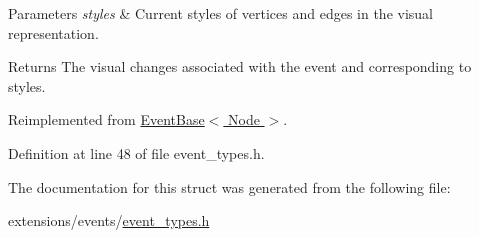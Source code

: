 \begin{DoxyParams}{Parameters}
{\em styles} & Current styles of vertices and edges in the visual representation. \\
\hline
\end{DoxyParams}
\begin{DoxyReturn}{Returns}
The visual changes associated with the event and corresponding to {\ttfamily styles}. 
\end{DoxyReturn}


Reimplemented from \hyperlink{structEventBase_a4ec560aec592ae86dd17e8714e9bdfc4}{Event\+Base$<$ Node $>$}.



Definition at line 48 of file event\+\_\+types.\+h.



The documentation for this struct was generated from the following file\+:\begin{DoxyCompactItemize}
\item 
extensions/events/\hyperlink{event__types_8h}{event\+\_\+types.\+h}\end{DoxyCompactItemize}
